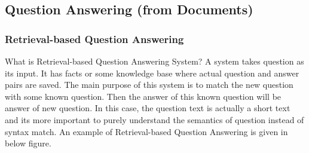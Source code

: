 \documentclass{doublecol-new}
\theoremstyle{TH}{
\newtheorem{lemma}{Lemma}
\newtheorem{theorem}[lemma]{Theorem}
\newtheorem{corrolary}[lemma]{Corrolary}
\newtheorem{conjecture}[lemma]{Conjecture}
\newtheorem{proposition}[lemma]{Proposition}
\newtheorem{claim}[lemma]{Claim}
\newtheorem{stheorem}[lemma]{Wrong Theorem}
\newtheorem{algorithm}{Algorithm}
}
\theoremstyle{THrm}{
\newtheorem{definition}{Definition}[section]
\newtheorem{question}{Question}[section]
\newtheorem{remark}{Remark}
\newtheorem{scheme}{Scheme}
}
\theoremstyle{THhit}{
\newtheorem{case}{Case}[section]
}
\begin{document}
\subsection{Question Answering (from Documents)}
\subsubsection{Retrieval-based Question Answering}

What is Retrieval-based Question Answering System? A system takes question as its input. It has facts or some knowledge base where actual question and answer pairs are saved. The main purpose of this system is to match the new question with some known question. Then the answer of this known question will be answer of new question. In this case, the question text is actually a short text and its more important to purely understand the semantics of question instead of syntax match. An example of Retrieval-based Question Answering is given in below figure. 
\end{document}

